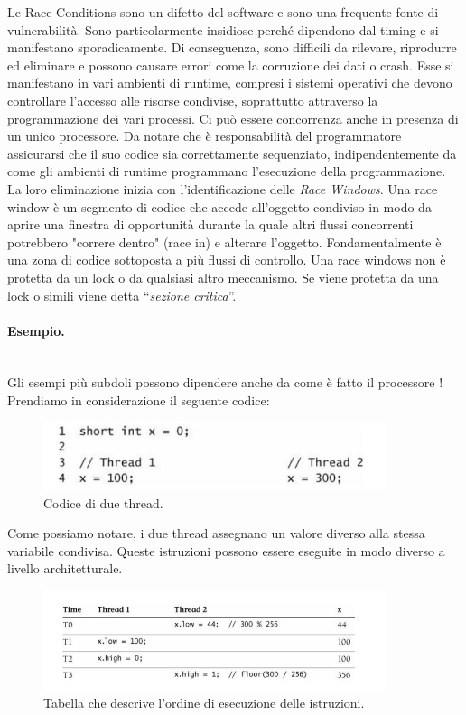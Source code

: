 Le Race Conditions sono un difetto del software e sono una frequente fonte di
vulnerabilità.
Sono particolarmente insidiose perché dipendono dal timing e si manifestano
sporadicamente. Di conseguenza, sono difficili da rilevare, riprodurre ed
eliminare e possono
causare errori come la corruzione dei dati o crash.
Esse si manifestano in vari ambienti di runtime, compresi i sistemi operativi
che devono
controllare l'accesso alle risorse condivise, soprattutto attraverso la
programmazione dei vari
processi. Ci può essere concorrenza anche in presenza di un unico processore.
Da notare che è responsabilità del programmatore assicurarsi che il suo codice
sia correttamente
sequenziato, indipendentemente da come gli ambienti di runtime programmano
l'esecuzione
della programmazione.
La loro eliminazione inizia con l'identificazione delle \textit{Race Windows}.
Una race window è un
segmento di codice che accede all'oggetto condiviso in modo da aprire una
finestra di opportunità
durante la quale altri flussi concorrenti potrebbero "correre dentro" (race in)
e alterare
l'oggetto. Fondamentalmente è una zona di codice sottoposta a più flussi di
controllo.
Una race windows non è protetta da un lock o da qualsiasi altro meccanismo.
Se viene
protetta da una lock o simili viene detta “\textit{sezione critica}”.

\paragraph{Esempio.}\ \\

Gli esempi più subdoli possono dipendere anche da come è fatto il processore !
Prendiamo in considerazione il seguente codice:

\begin{figure}[H]
    \centering
    \includegraphics[width=10cm, keepaspectratio]{capitoli/secure_coding/img/cap_6/esempio1.png}
    \caption{Codice di due thread.}
\end{figure}

Come possiamo notare, i due thread assegnano un valore diverso alla stessa variabile
condivisa. Queste istruzioni
possono essere eseguite in modo diverso a livello architetturale.

\begin{figure}[H]
    \centering
    \includegraphics[width=10cm, keepaspectratio]{capitoli/secure_coding/img/cap_6/esempio1_tab.png}
    \caption{Tabella che descrive l'ordine di esecuzione delle istruzioni.}
\end{figure}

